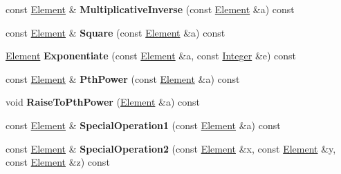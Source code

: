 \begin{DoxyCompactItemize}
\item 
\hypertarget{class_g_f_p2___o_n_b_a566a641ac8a1ffc03e056e93d661a3f3}{
const \hyperlink{class_g_f_p2_element}{Element} \& {\bfseries MultiplicativeInverse} (const \hyperlink{class_g_f_p2_element}{Element} \&a) const }
\label{class_g_f_p2___o_n_b_a566a641ac8a1ffc03e056e93d661a3f3}

\item 
\hypertarget{class_g_f_p2___o_n_b_af0e2b0a96d4f5124ab43d5373c7057fe}{
const \hyperlink{class_g_f_p2_element}{Element} \& {\bfseries Square} (const \hyperlink{class_g_f_p2_element}{Element} \&a) const }
\label{class_g_f_p2___o_n_b_af0e2b0a96d4f5124ab43d5373c7057fe}

\item 
\hypertarget{class_g_f_p2___o_n_b_ab53558de23eee9d796ab9cdb496bf793}{
\hyperlink{class_g_f_p2_element}{Element} {\bfseries Exponentiate} (const \hyperlink{class_g_f_p2_element}{Element} \&a, const \hyperlink{class_integer}{Integer} \&e) const }
\label{class_g_f_p2___o_n_b_ab53558de23eee9d796ab9cdb496bf793}

\item 
\hypertarget{class_g_f_p2___o_n_b_aa4c7a549af3a591f10f05bff645e9d38}{
const \hyperlink{class_g_f_p2_element}{Element} \& {\bfseries PthPower} (const \hyperlink{class_g_f_p2_element}{Element} \&a) const }
\label{class_g_f_p2___o_n_b_aa4c7a549af3a591f10f05bff645e9d38}

\item 
\hypertarget{class_g_f_p2___o_n_b_a26a3aaac8d7a1a3a48720544eaa1a8d5}{
void {\bfseries RaiseToPthPower} (\hyperlink{class_g_f_p2_element}{Element} \&a) const }
\label{class_g_f_p2___o_n_b_a26a3aaac8d7a1a3a48720544eaa1a8d5}

\item 
\hypertarget{class_g_f_p2___o_n_b_a114d4f5aae022c1b021aadc3698b8ee7}{
const \hyperlink{class_g_f_p2_element}{Element} \& {\bfseries SpecialOperation1} (const \hyperlink{class_g_f_p2_element}{Element} \&a) const }
\label{class_g_f_p2___o_n_b_a114d4f5aae022c1b021aadc3698b8ee7}

\item 
\hypertarget{class_g_f_p2___o_n_b_a082e11a05ea7d2db4b559783f4ee8cbe}{
const \hyperlink{class_g_f_p2_element}{Element} \& {\bfseries SpecialOperation2} (const \hyperlink{class_g_f_p2_element}{Element} \&x, const \hyperlink{class_g_f_p2_element}{Element} \&y, const \hyperlink{class_g_f_p2_element}{Element} \&z) const }
\label{class_g_f_p2___o_n_b_a082e11a05ea7d2db4b559783f4ee8cbe}

\end{DoxyCompactItemize}
